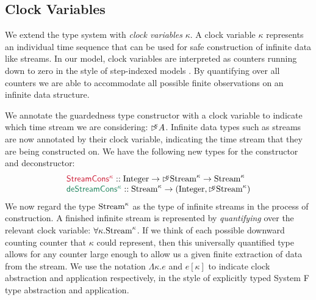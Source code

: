 \subsection{Clock Variables}
\label{sec:clock-vars}

We extend the type system with \emph{clock variables} $\kappa$. A
clock variable $\kappa$ represents an individual time sequence that
can be used for safe construction of infinite data like streams. In
our model, clock variables are interpreted as counters running down to
zero in the style of step-indexed models \cite{mcallester-appel}. By
quantifying over all counters we are able to accommodate all possible
finite observations on an infinite data structure.

We annotate the guardedness type constructor with a clock variable to
indicate which time stream we are considering: $\mathord{\rhd\kern-0.4em^{\kappa}}
A$. Infinite data types such as streams are now annotated by their
clock variable, indicating the time stream that they are being
constructed on. We have the following new types for the constructor
and deconstructor:
\begin{displaymath}
  \begin{array}{l}
    \cons{StreamCons$^\kappa$} :: \tyname{Integer} \to \delay\kappa \tyname{Stream}^\kappa \to \tyname{Stream}^\kappa \\
    \elim{deStreamCons$^\kappa$} :: \tyname{Stream}^\kappa \to (\tyname{Integer}, \delay\kappa\tyname{Stream}^\kappa)    
  \end{array}
\end{displaymath}
We now regard the type $\textrm{Stream}^\kappa$ as the type of
infinite streams in the process of construction. A finished infinite
stream is represented by \emph{quantifying} over the relevant clock
variable: $\forall \kappa. \textrm{Stream}^\kappa$. If we think of
each possible downward counting counter that $\kappa$ could represent,
then this universally quantified type allows for any counter large
enough to allow us a given finite extraction of data from the
stream. We use the notation $\Lambda\kappa. e$ and $e[\kappa]$ to
indicate clock abstraction and application respectively, in the style
of explicitly typed System F type abstraction and application.

